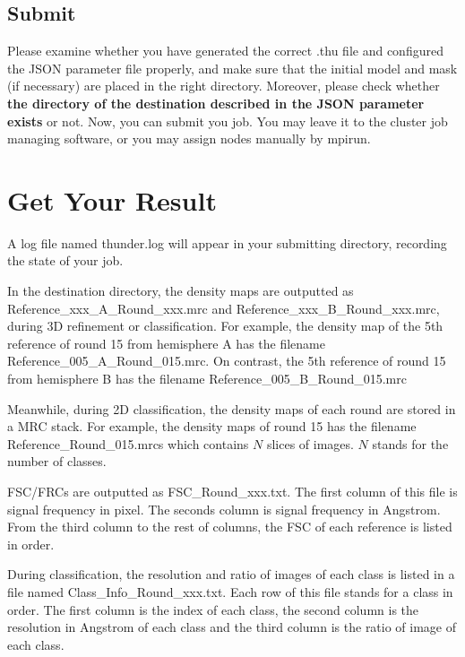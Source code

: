 \documentclass{article}
\begin{document}
        \subsection{Submit}
        
        Please examine whether you have generated the correct \textsf{.thu} file and configured the JSON parameter file properly, and make sure that the initial model and mask (if necessary) are placed in the right directory. Moreover, please check whether \textbf{the directory of the destination described in the JSON parameter exists} or not. Now, you can submit you job. You may leave it to the cluster job managing software, or you may assign nodes manually by \textsf{mpirun}.
    
    \section{Get Your Result}
    
        A log file named \textsf{thunder.log} will appear in your submitting directory, recording the state of your job.
        
        In the destination directory, the density maps are outputted as \textsf{Reference\_xxx\_A\_Round\_xxx.mrc} and \textsf{Reference\_xxx\_B\_Round\_xxx.mrc}, during 3D refinement or classification. For example, the density map of the 5th reference of round 15 from hemisphere A has the filename \textsf{Reference\_005\_A\_Round\_015.mrc}. On contrast, the 5th reference of round 15 from hemisphere B has the filename \textsf{Reference\_005\_B\_Round\_015.mrc}
        
        Meanwhile, during 2D classification, the density maps of each round are stored in a MRC stack. For example, the density maps of round 15 has the filename \textsf{Reference\_Round\_015.mrcs} which contains $N$ slices of images. $N$ stands for the number of classes.

        FSC/FRCs are outputted as \textsf{FSC\_Round\_xxx.txt}. The first column of this file is signal frequency in pixel. The seconds column is signal frequency in Angstrom. From the third column to the rest of columns, the FSC of each reference is listed in order.
        
        During classification, the resolution and ratio of images of each class is listed in a file named \textsf{Class\_Info\_Round\_xxx.txt}. Each row of this file stands for a class in order. The first column is the index of each class, the second column is the resolution in Angstrom of each class and the third column is the ratio of image of each class.
\end{document}
